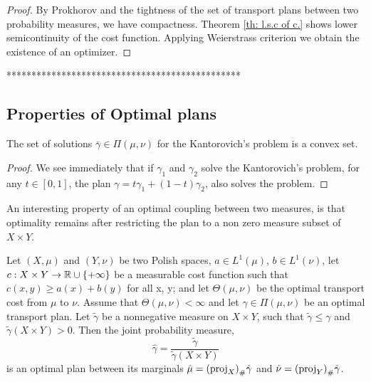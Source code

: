 \begin{theorem}
\begin{proof}
 By Prokhorov and the tightness of the set of transport plans between two probability measures, we have compactness. Theorem \eqref{th: l.s.c of c.} shows lower semicontinuity of the cost function. Applying Weierstrass criterion we obtain the existence of an optimizer.
\end{proof}

***********************************************
\subsection{Properties of Optimal plans}
\begin{theorem}
	The set of solutions $\bar\gamma\in\Pi(\mu,\nu)$ for the Kantorovich's problem is a convex set.
\end{theorem}
\begin{proof}
	We see immediately that if $\gamma_1$ and $\gamma_2$ solve the Kantorovich's problem, for any $t\in[0,1]$, the plan $\gamma=t\gamma_1+(1-t)\gamma_2$, also solves the problem. 
\end{proof}
\end{theorem}
An interesting property of an optimal coupling between two measures, is that optimality remains after restricting the plan to a non zero measure subset of $X\times Y$. 
\begin{theorem}
	Let $(X, \mu)$ and $(Y, \nu)$ be two Polish spaces, $a \in L^1(\mu)$, $b \in L^1(\nu)$, let $c : X \times Y \rightarrow
	\mathbb{R}\cup \left\lbrace +\infty \right\rbrace$ be a measurable cost function such that $c(x, y) \geq a(x) + b(y)$ for all x, y; and let $\Theta(\mu, \nu)$ be the optimal transport cost from $\mu$ to $\nu$.
	Assume that $\Theta(\mu, \nu)<\infty$  and let $\gamma \in \Pi(\mu,\nu)$ be an optimal transport plan. Let $\tilde\gamma$ be a nonnegative measure on $X\times Y$, such that $\tilde \gamma\leq \gamma$ and $\tilde \gamma(X\times Y)>0$. Then the joint probability measure,
	\begin{equation*}
	\hat\gamma = \frac{\tilde\gamma}{\tilde\gamma(X\times Y)}
	\end{equation*}
	is an optimal plan between its marginals $\hat\mu={(\mathrm{proj}_X)}_{\#} \hat \gamma$ and $\hat\nu ={(\mathrm{proj}_Y)}_{\#} \hat \gamma$. 	
\end{theorem}

